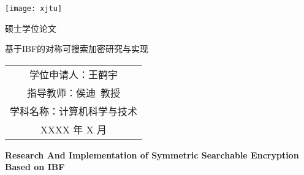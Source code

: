 
\begin{titlepage}
	\begin{center}
		\begin{figure*}[!ht]\vspace{5em}
			\centering
			\texttt{[image: xjtu]}
		\end{figure*}
		
		\vspace{1.5em}
		\begin{center} { 硕士学位论文} \end{center}
		
		\vspace{8.5em}
		\begin{center} {\sanhao\hei 基于IBF的对称可搜索加密研究与实现}\end{center}
		
		\vspace{15em}
		{\sanhao
			\begin{center} \renewcommand{\arraystretch}{1.5}
				\begin{tabular}{c}
					学位申请人：王鹤宇 \\
					指导教师：侯迪~教授 \\
					学科名称：计算机科学与技术 \\
					XXXX 年 X 月 \\
				\end{tabular} \renewcommand{\arraystretch}{1}
			\end{center} 
		}
	\end{center}
	\clearpage{\pagestyle{empty}\cleardoublepage}
	
	\newpage\thispagestyle{empty}
	\begin{center}
		\parbox[t][0.7cm][t]{\textwidth}{}
		
		\begin{center}{\sanhao\bfseries Research And Implementation of Symmetric Searchable Encryption Based on IBF}\end{center}
		

\end{center}
\end{titlepage}
